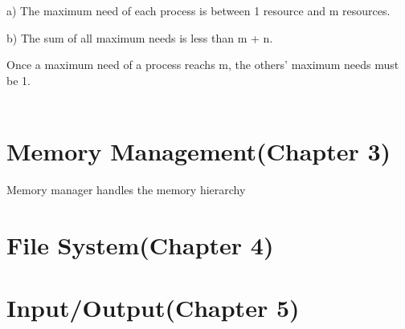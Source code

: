 \documentclass[]{report}
\begin{document}
a) The maximum need of each process is between 1
resource and m resources.

b) The sum of all maximum needs is less than m + n.

Once a maximum need of a process reachs m, the others' maximum needs must be 1.\\\\

\section*{Memory Management(Chapter 3)}
Memory manager handles the memory hierarchy















\section*{File System(Chapter 4)}
\section*{Input/Output(Chapter 5)}
\end{document}
